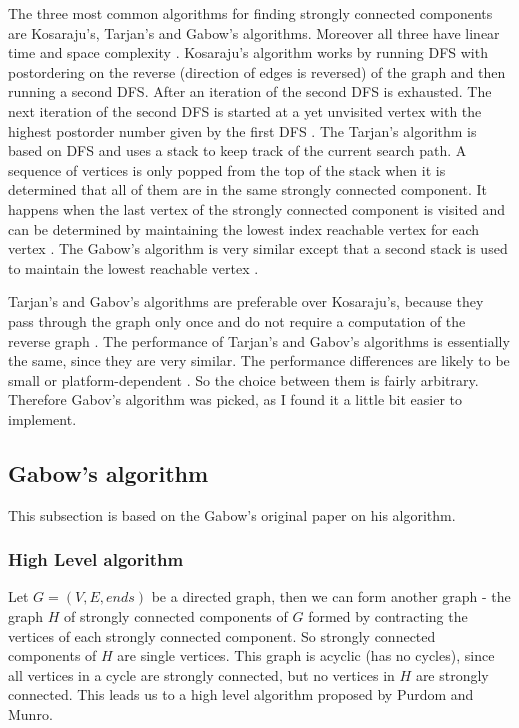 \documentclass{report}
\theoremstyle{plain}
\theoremstyle{definition}
\theoremstyle{remark}
\numberwithin{definition}{chapter}
\numberwithin{example}{chapter}
\numberwithin{figure}{chapter}
\begin{document}
The three most common algorithms for finding strongly connected components are Kosaraju's, Tarjan's and Gabow's algorithms. Moreover all three have linear time and space complexity \cite{c++_sedgewick}. Kosaraju's algorithm works by running DFS with postordering on the reverse (direction of edges is reversed) of the graph and then running a second DFS. After an iteration of the second DFS is exhausted. The next iteration of the second DFS is started at a yet unvisited vertex with the highest postorder number given by the first DFS \cite{c++_sedgewick}. The Tarjan's algorithm is based on DFS and uses a stack to keep track of the current search path. A sequence of vertices is only popped from the top of the stack when it is determined that all of them are in the same strongly connected component. It happens when the last vertex of the strongly connected component is visited and can be determined by maintaining the lowest index  reachable vertex for each vertex \cite{c++_sedgewick}. The Gabow's algorithm is very similar except that a second stack is used to maintain the lowest reachable vertex \cite{c++_sedgewick}.

Tarjan's and Gabov's algorithms are preferable over Kosaraju's, because they pass through the graph only once and do not require a computation of the reverse graph \cite{c++_sedgewick}. The performance of Tarjan's and Gabov's algorithms is essentially the same, since they are very similar. The performance differences are likely to be small or platform-dependent \cite{Gabow2000107}. So the choice between them is fairly arbitrary. Therefore Gabov's algorithm was picked, as I found it a little bit easier to implement.

\subsection{Gabow's algorithm}

This subsection is based on the Gabow's original paper \cite{Gabow2000107} on his algorithm.

\subsubsection*{High Level algorithm}

Let $G=(V, E, ends)$ be a directed graph, then we can form another graph - the graph $H$ of strongly connected components of $G$ formed by contracting the vertices of each strongly connected component. So strongly connected components of $H$ are single vertices. This graph is acyclic (has no cycles), since all vertices in a cycle are strongly connected, but no vertices in $H$ are strongly connected. This leads us to a high level algorithm proposed by Purdom and Munro.
\end{document}
